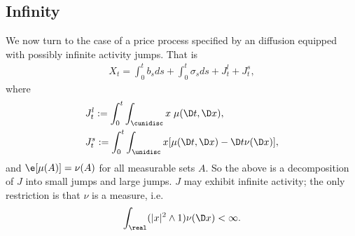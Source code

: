 \subsection{Infinity}
We now turn to the case of a price process specified by an \ito diffusion equipped with  possibly infinite activity \levy jumps.  That is  
\begin{align}
X_t  = \int_0^t b_s ds + \int_0^t \sigma_s ds +  J^l_t + J^s_t, 
  \label{eq:j}
\end{align}
where
\begin{align}
  & J^l_t := \int^t_0 \int_\cunidisc x \;  \mu(\D t, \D x),\label{eq:j1}\\ 
  & J^s_t := \int^t_0 \int_\unidisc x  [\mu(\D t, \D x) - \D t\nu(\D x)],  
  \label{eq:j2}
\end{align}
and $\e[\mu(A)] = \nu(A)$ for all measurable sets $A$. So the above is a decomposition of $J$ into small jumps and large jumps. $J$  may exhibit infinite activity; the only restriction is that $\nu$ is a \levy measure, i.e. 
\begin{align}
  \int_\real (\vert x \vert^2 \wedge 1) \nu(\D x) < \infty.\notag
  \label{}
\end{align}

